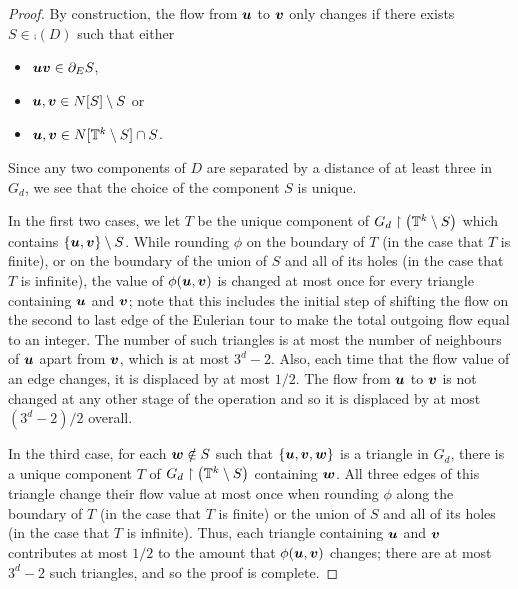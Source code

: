 \documentclass[12pt,a4paper]{amsart}
\numberwithin{equation}{section}
\theoremstyle{definition}
\begin{document}
\begin{proof}
By construction, the flow from $\boldsymbol{u}$ to $\boldsymbol{v}$ only changes if there exists $S\in\comp(D)$ such that either
\begin{itemize}
\item $\boldsymbol{u}\boldsymbol{v}\in \partial_ES$,
\item $\boldsymbol{u},\boldsymbol{v}\in N[S]\setminus S$ or
\item $\boldsymbol{u},\boldsymbol{v}\in N[\mathbb{T}^k\setminus S]\cap S$. 
\end{itemize}
Since any two components of $D$ are separated by a distance of at least three in $G_d$, we see that the choice of the component $S$ is unique. 

In the first two cases, we let $T$ be the unique component of $G_d\upharpoonright \left(\mathbb{T}^k\setminus S\right)$ which contains $\{\boldsymbol{u},\boldsymbol{v}\}\setminus S$. While rounding $\phi$ on the boundary of $T$ (in the case that $T$ is finite), or on the boundary of the union of $S$ and all of its holes (in the case that $T$ is infinite), the value of $\phi(\boldsymbol{u},\boldsymbol{v})$ is changed at most once for every triangle containing $\boldsymbol{u}$ and $\boldsymbol{v}$; note that this includes the initial step of shifting the flow on the second to last edge of the Eulerian tour to make the total outgoing flow equal to an integer. The number of such triangles is at most the number of neighbours of $\boldsymbol{u}$ apart from $\boldsymbol{v}$, which is at most $3^d-2$. Also, each time that the flow value of an edge changes, it is displaced by at most $1/2$. The flow from $\boldsymbol{u}$ to $\boldsymbol{v}$ is not changed at any other stage of the operation and so it is displaced by at most $(3^d-2)/2$ overall.

In the third case, for each $\boldsymbol{w}\notin S$ such that $\{\boldsymbol{u},\boldsymbol{v},\boldsymbol{w}\}$ is a triangle in $G_d$, there is a unique component $T$ of $G_d\upharpoonright \left(\mathbb{T}^k\setminus S\right)$ containing $\boldsymbol{w}$. All three edges of this triangle change their flow value at most once when rounding $\phi$ along the boundary of $T$ (in the case that $T$ is finite) or the union of $S$ and all of its holes (in the case that $T$ is infinite). Thus, each triangle containing $\boldsymbol{u}$ and $\boldsymbol{v}$ contributes at most $1/2$ to the amount that $\phi(\boldsymbol{u},\boldsymbol{v})$ changes; there are at most $3^d-2$ such triangles, and so the proof is complete.
\end{proof}
\end{document}
